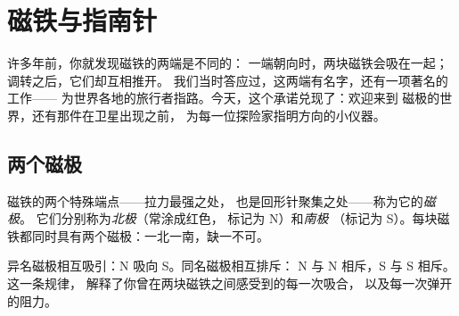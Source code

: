 \chapter{磁铁与指南针}\label{ch:g4:magnets-and-compass}

许多年前，你就发现磁铁的两端是不同的：
一端朝向时，两块磁铁会吸在一起；调转之后，它们却互相推开。
我们当时答应过，这两端有名字，还有一项著名的工作——
为世界各地的旅行者指路。今天，这个承诺兑现了：欢迎来到
磁极的世界，还有那件在卫星出现之前，
为每一位探险家指明方向的小仪器。

\section{两个磁极}

\begin{definition}[磁极]\label{def:g4:magnets-and-compass:poles}
磁铁的两个特殊端点——拉力最强之处，
也是回形针聚集之处——称为它的\emph{磁极}。
它们分别称为\emph{北极}（常涂成红色，
标记为 N）和\emph{南极}
（标记为 S）。每块磁铁都同时具有两个磁极：一北一南，缺一不可。
\end{definition}

\begin{proposition}[磁极规律]\label{prop:g4:magnets-and-compass:rule}
异名磁极相互吸引：N 吸向 S。同名磁极相互排斥：
N 与 N 相斥，S 与 S 相斥。这一条规律，
解释了你曾在两块磁铁之间感受到的每一次吸合，
以及每一次弹开的阻力。
\end{proposition}

